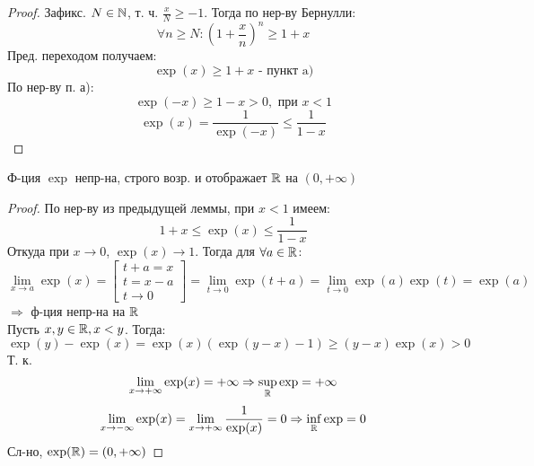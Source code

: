 \begin{proof}
Зафикс. $N \in \mathbb{N}$, т. ч. $\frac{x}{N} \geq -1$. Тогда по нер-ву Бернулли:
\[
\forall n \geq N \colon \left(1 + \frac{x}{n}\right)^{n} \geq 1 + x
\]
Пред. переходом получаем:
\[
 \exp(x) \geq 1 + x \text{ - пункт a)}
\]
По нер-ву п. а):
\[
\exp(-x) \geq 1 - x > 0, \text{ при $x < 1$}
\]
\[
\exp(x) = \frac{1}{\exp(-x)} \leq \frac{1}{1 - x}
\]
\end{proof}
\begin{theorem}
Ф-ция $\exp$ непр-на, строго возр. и отображает $\mathbb{R}$ на $(0, +\infty)$
\end{theorem}
\begin{proof}
По нер-ву из предыдущей леммы, при $x < 1$ имеем:
\[
1 + x \leq \exp(x) \leq \frac{1}{1 - x}
\]
Откуда при $x \rightarrow 0$, $\exp(x) \rightarrow 1$. Тогда для $\forall a \in \mathbb{R}$:
\[
\lim_{x\to a} \exp(x) = \begin{bmatrix} t + a = x \\ t = x - a \\ t \rightarrow 0\end{bmatrix} = \lim_{t\to 0} \exp(t + a) = \lim_{t\to 0} \exp(a) \exp(t) = \exp(a)
\]
$\Rightarrow$ ф-ция непр-на на $\mathbb{R}$ \\

Пусть $x, y \in \mathbb{R}, x < y$. Тогда:
\[
\exp(y) - \exp(x) = \exp(x)(\exp(y - x) - 1) \geq (y - x)\exp(x) > 0
\]
Т. к.
\[
  \lim_{x\to+\infty} \exp(x) = +\infty \Rightarrow \underset{\mathbb{R}}{\sup} \exp = +\infty
\]
\[
\lim_{x\to-\infty} \exp(x) = \lim_{x\to +\infty} \frac{1}{\exp(x)} = 0 \Rightarrow \underset{\mathbb{R}}{\inf}\exp = 0
\]
Сл-но, $\exp(\mathbb{R}) = (0, +\infty)$
\end{proof}

